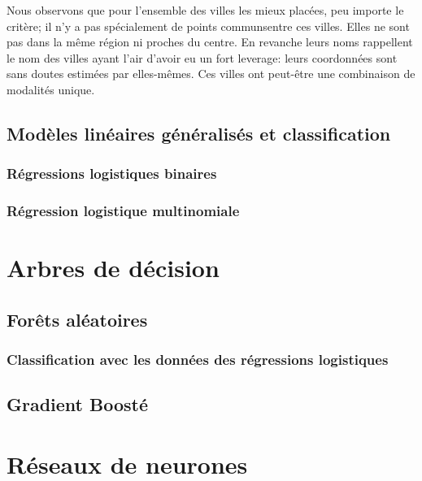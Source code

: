\documentclass[french]{article}%
\begin{document}
			Nous observons que pour l'ensemble des villes les mieux placées, peu importe le critère; il n’y a pas spécialement de points communsentre ces villes. Elles ne sont pas dans la même région ni proches du centre. En revanche leurs noms rappellent le nom des villes ayant l’air d’avoir eu un fort leverage: leurs coordonnées sont sans doutes estimées par elles-mêmes. Ces villes ont peut-être une combinaison de modalités unique.
			
	\subsection{Modèles linéaires généralisés et classification}

	\subsubsection{Régressions logistiques binaires}

	\subsubsection{Régression logistique multinomiale}	
	
	\section{Arbres de décision}
	
	\subsection{Forêts aléatoires}
	
	\subsubsection{Classification avec les données des régressions logistiques}
	
	\subsection{Gradient Boosté}
	
	\section{Réseaux de neurones}
	
	
		
	\newpage
	
	\printbibliography
	
\end{document}

